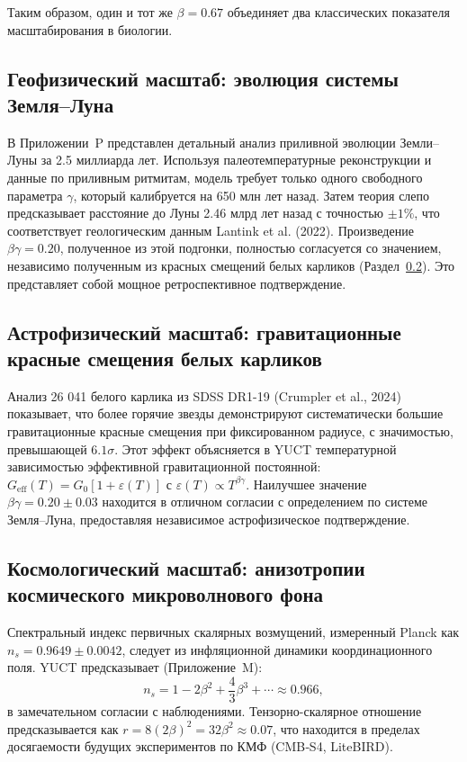\documentclass[11pt,a4paper]{article}
\begin{document}
	Таким образом, один и тот же \(\beta = 0.67\) объединяет два классических показателя масштабирования в биологии.
	
	\subsection{Геофизический масштаб: эволюция системы Земля–Луна}
	\label{subsec:earth-moon}
	
	В Приложении~P представлен детальный анализ приливной эволюции Земли–Луны за 2.5 миллиарда лет. Используя палеотемпературные реконструкции и данные по приливным ритмитам, модель требует только одного свободного параметра \(\gamma\), который калибруется на 650 млн лет назад. Затем теория слепо предсказывает расстояние до Луны 2.46 млрд лет назад с точностью \(\pm 1\%\), что соответствует геологическим данным Lantink et al. (2022). Произведение \(\beta\gamma = 0.20\), полученное из этой подгонки, полностью согласуется со значением, независимо полученным из красных смещений белых карликов (Раздел~\ref{subsec:wd}). Это представляет собой мощное ретроспективное подтверждение.
	
	\subsection{Астрофизический масштаб: гравитационные красные смещения белых карликов}
	\label{subsec:wd}
	
	Анализ 26 041 белого карлика из SDSS DR1-19 (Crumpler et al., 2024) показывает, что более горячие звезды демонстрируют систематически большие гравитационные красные смещения при фиксированном радиусе, с значимостью, превышающей \(6.1\sigma\). Этот эффект объясняется в YUCT температурной зависимостью эффективной гравитационной постоянной: \(G_{\mathrm{eff}}(T) = G_0[1 + \varepsilon(T)]\) с \(\varepsilon(T) \propto T^{\beta\gamma}\). Наилучшее значение \(\beta\gamma = 0.20 \pm 0.03\) находится в отличном согласии с определением по системе Земля–Луна, предоставляя независимое астрофизическое подтверждение.
	
	\subsection{Космологический масштаб: анизотропии космического микроволнового фона}
	\label{subsec:cmb}
	
	Спектральный индекс первичных скалярных возмущений, измеренный Planck как \(n_s = 0.9649 \pm 0.0042\), следует из инфляционной динамики координационного поля. YUCT предсказывает (Приложение~M):
	\[
	n_s = 1 - 2\beta^2 + \frac{4}{3}\beta^3 + \cdots \approx 0.966,
	\]
	в замечательном согласии с наблюдениями. Тензорно-скалярное отношение предсказывается как \(r = 8(2\beta)^2 = 32\beta^2 \approx 0.07\), что находится в пределах досягаемости будущих экспериментов по КМФ (CMB‑S4, LiteBIRD).
	
\end{document}
